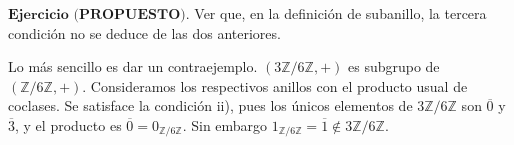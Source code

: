\documentclass{article}
\begin{document}
$\textbf{Ejercicio (PROPUESTO).}$ Ver que, en la definición de subanillo, la tercera condición no se deduce de las dos anteriores.
\begin{adjustwidth}{0.5cm}{}
    Lo más sencillo es dar un contraejemplo. $(3\mathbb{Z}/6\mathbb{Z}, +)$ es subgrupo de $(\mathbb{Z}/6\mathbb{Z}, +)$. Consideramos los respectivos anillos con el producto usual de coclases. Se satisface la condición ii), pues los únicos elementos de $3\mathbb{Z}/6\mathbb{Z}$ son $\overline{0}$ y $\overline{3}$, y el producto es $\overline{0} = 0_{\mathbb{Z}/6\mathbb{Z}}$. Sin embargo $1_{\mathbb{Z}/6\mathbb{Z}} = \overline{1} \not \in 3\mathbb{Z}/6\mathbb{Z}$.\\
\end{adjustwidth}
\end{document}
